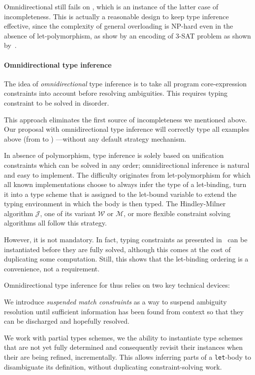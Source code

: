 \documentclass[acmsmall,screen,nonacm]{acmart}
\begin{document}
Omnidirectional still fails on , which is an instance of the
latter case of incompleteness. This is actually a reasonable design to keep
type inference effective, since the complexity of general overloading is
NP-hard even in the absence of let-polymorphism, as show by an encoding of
3-SAT problem as shown by~\citet
{Chargueraud-Bodin-Dunfield-Riboulet/jfla2025}.


\paragraph{Omnidirectional type inference}

The idea of \emph{omnidirectional} type inference is to take all program
core-expression constraints into account before resolving ambiguities. This
requires typing constraint to be solved in disorder.

This approach eliminates the first source of incompleteness we mentioned
above. Our proposal with omnidirectional type inference will correctly type
all examples above (from  to )\ignorespaces {} ---without
any default strategy mechanism.

In absence of polymorphism, type inference is solely based on unification
constraints which can be solved in any order; omnidirectional inference is
natural and easy to implement. The difficulty originates from \ML
let-polymorphism for which all known implementations choose to always infer
the type of a let-binding, turn it into a type scheme that is assigned to
the let-bound variable to extend the typing environment in which the body is
then typed. The Hindley-Milner algorithm $\mathcal{J}$, one of its variant
$\mathcal{W}$ or $\mathcal{M}$, or more flexible constraint solving
algorithms all follow this strategy.

However, it is not mandatory. In fact, typing constraints as presented
in~\cite {Pottier-Remy/emlti} can be instantiated before they are fully
solved, although this comes at the cost of duplicating some computation.
Still, this shows that the let-binding ordering is a convenience, not a
requirement.

Omnidirectional type inference for \ML thus relies on two key technical devices:
\begin{enumerate*}
\item
  We introduce \emph{suspended match constraints} as a way to suspend
  ambiguity resolution until sufficient information has been found from
  context so that they can be discharged and hopefully resolved.
\item
  We work with partial types schemes, \ie we the ability to instantiate type
  schemes that are not yet fully determined and consequently revisit their
  instances when their are being refined, incrementally. This allows
  inferring parts of a \texttt{let}-body to disambiguate its definition,
  without duplicating constraint-solving work.
\end{enumerate*}
\end{document}
